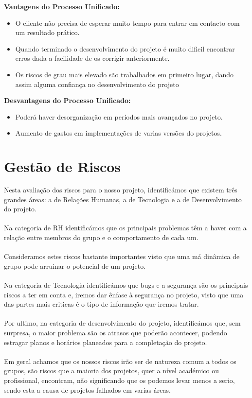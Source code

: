 \documentclass[12pt, a4paper, twoside]{report} %
\begin{document}
\textbf{Vantagens do Processo Unificado:}
\begin{itemize}
\item O cliente não precisa de esperar muito tempo para entrar em contacto com um resultado prático.
\item Quando terminado o desenvolvimento do projeto é muito dificil encontrar erros dada a facilidade de os corrigir anteriormente.
\item Os riscos de grau mais elevado são trabalhados em primeiro lugar, dando assim alguma confiança no desenvolvimento do projeto
\end{itemize}

\textbf{Desvantagens do Processo Unificado:}
\begin{itemize}
\item Poderá haver desorganização em períodos mais avançados no projeto.
\item Aumento de gastos em implementações de varias versões do projetos.
\end{itemize}


\clearpage


\section{Gestão de Riscos}

Nesta avaliação dos riscos para o nosso projeto, identificámos que existem três grandes áreas: a de Relações Humanas, a de Tecnologia e a de Desenvolvimento do projeto.\\\\ Na categoria de RH identificámos que os principais problemas têm a haver com a relação entre membros do grupo e o comportamento de cada um. \\\\Consideramos estes riscos bastante importantes visto que uma má dinâmica de grupo pode arruinar o potencial de um projeto.\\\\ Na categoria de Tecnologia identificámos que bugs e a segurança são os principais riscos a ter em conta e, iremos dar ênfase à segurança no projeto, visto que uma das partes mais criticas é o tipo de informação que iremos tratar.\\\\ Por ultimo, na categoria de desenvolvimento do projeto, identificámos que, sem surpresa, o maior problema são os atrasos que poderão acontecer, podendo estragar planos e horários planeados para a completação do projeto.\\\\ Em geral achamos que os nossos riscos irão ser de natureza comum a todos os grupos, são riscos que a maioria dos projetos, quer a nível académico ou profissional, encontram, não significando que os podemos levar menos a serio, sendo esta a causa de projetos falhados em varias áreas.
\end{document}
